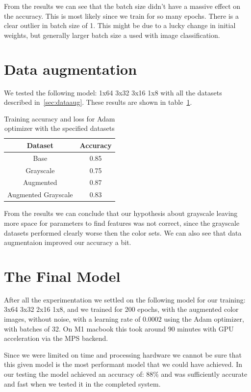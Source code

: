 \documentclass[12pt,a4paper,english
]{tunithesis}
\begin{document}
From the results we can see that the batch size didn't have a massive effect on the accuracy. This is most likely since we train for so many epochs. There is a clear outlier in batch size of 1. This might be due to a lucky change in initial weights, but generally larger batch size a used with image classification.

\section{Data augmentation}
We tested the following model: 1x64 3x32 3x16 1x8 with all the datasets described in~\ref{sec:dataaug}. These results are shown in table~\ref{tab:dataaug}.
\begin{table}[h!]
\centering
\caption{Training accuracy and loss for Adam optimizer with the specified datasets}
\begin{tabular}{|c|c|}
\hline
\textbf{Dataset} & \textbf{Accuracy} \\ \hline
Base & 0.85 \\ \hline
Grayscale & 0.75 \\ \hline
Augmented & 0.87  \\ \hline
Augmented Grayscale & 0.83  \\ \hline
\end{tabular}
\label{tab:dataaug}
\end{table}

From the results we can conclude that our hypothesis about grayscale leaving more space for parameters to find features was not correct, since the grayscale datasets performed clearly worse then the color sets. We can also see that data augmentaion improved our accuracy a bit.

\section{The Final Model}
After all the experimentation we settled on the following model for our training: 3x64 3x32 2x16 1x8, and we trained for 200 epochs, with the augmented color images, without noise, with a learning rate of $0.0002$ using the Adam optimizer, with batches of 32. On M1 macbook this took around 90 minutes with GPU acceleration via the MPS backend.

Since we were limited on time and processing hardware we cannot be sure that this given model is the most performant model that we could have achieved. In our testing the model achieved an accuracy of: 88\% and was sufficiently accurate and fast when we tested it in the completed system.
\end{document}
